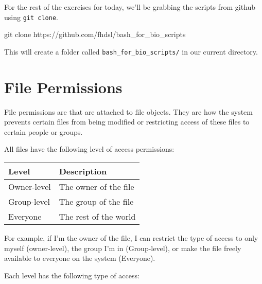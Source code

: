 \documentclass[
  letterpaper,
  DIV=11,
  numbers=noendperiod]{scrreprt}
\newenvironment{Shaded}{\begin{snugshade}}{\end{snugshade}}
\newcommand{\FunctionTok}[1]{\textcolor[rgb]{0.28,0.35,0.67}{#1}}
\newcommand{\NormalTok}[1]{\textcolor[rgb]{0.00,0.23,0.31}{#1}}
\begin{document}
For the rest of the exercises for today, we'll be grabbing the scripts
from github using \texttt{git\ clone}.

\begin{Shaded}
\begin{Highlighting}[]
\FunctionTok{git}\NormalTok{ clone https://github.com/fhdsl/bash\_for\_bio\_scripts}
\end{Highlighting}
\end{Shaded}

This will create a folder called \texttt{bash\_for\_bio\_scripts/} in
our current directory.

\section{File Permissions}\label{sec-permissions}

File permissions are that are attached to file objects. They are how the
system prevents certain files from being modified or restricting access
of these files to certain people or groups.

All files have the following level of access permissions:

\begin{longtable}[]{@{}ll@{}}
\toprule\noalign{}
Level & Description \\
\midrule\noalign{}
\endhead
\bottomrule\noalign{}
\endlastfoot
Owner-level & The owner of the file \\
Group-level & The group of the file \\
Everyone & The rest of the world \\
\end{longtable}

For example, if I'm the owner of the file, I can restrict the type of
access to only myself (owner-level), the group I'm in (Group-level), or
make the file freely available to everyone on the system (Everyone).

Each level has the following type of access:
\end{document}
